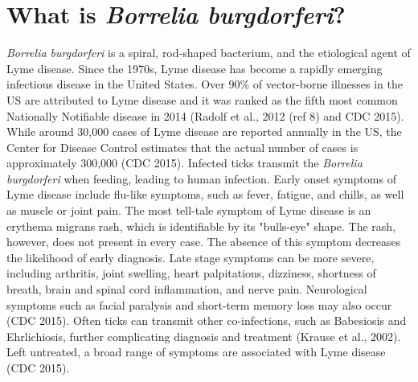 \documentclass[12pt,twoside]{reedthesis}
\begin{document}
\section*{What is \textit{Borrelia burgdorferi}?}
\newcommand{\FAstdfit}{r = $\frac{\Delta r \cdot P}{K_{d} + P }$ + $r_{min}$}

	\textit{Borrelia burgdorferi} is a spiral, rod-shaped bacterium, and the etiological agent of Lyme disease. Since the 1970s, Lyme disease has become a rapidly emerging infectious disease in the United States. Over 90\% of vector-borne illnesses in the US are attributed to Lyme disease and it was ranked as the fifth most common Nationally Notifiable disease in 2014 (Radolf et al., 2012 (ref 8) and CDC 2015). While around 30,000 cases of Lyme disease are reported annually in the US, the Center for Disease Control estimates that the actual  number of cases is approximately 300,000 (CDC 2015). Infected ticks transmit the \textit{Borrelia burgdorferi} when feeding, leading to human infection. Early onset symptoms of Lyme disease include flu-like symptoms, such as fever, fatigue, and chills, as well as muscle or joint pain. The most tell-tale symptom of Lyme disease is an erythema migrans rash, which is identifiable by its "bulls-eye" shape. The rash, however, does not present in every case. The absence of this symptom decreases the likelihood of early diagnosis. Late stage symptoms can be more severe, including arthritis, joint swelling, heart palpitations, dizziness, shortness of breath, brain and spinal cord inflammation, and nerve pain. Neurological symptoms such as facial paralysis and short-term memory loss may also occur (CDC 2015). Often ticks can transmit other co-infections, such as Babesiosis and Ehrlichiosis, further complicating diagnosis and treatment (Krause et al., 2002). Left untreated, a broad range of symptoms are associated with Lyme disease (CDC 2015). 
	
\end{document}
